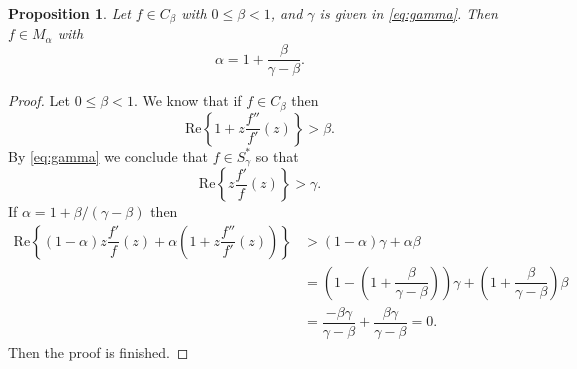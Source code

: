 \documentclass[10pt,a4paper]{amsart}
\newtheorem{prop}{Proposition}
\begin{document}
\begin{prop}\label{prop_alpha}
Let \( f\in C_\beta \) with \(0 \leq \beta <1 \), and  \( \gamma \) is given in \eqref{eq:gamma}. Then \( f\in M_\alpha \) with
\[\alpha=1+\dfrac{\beta}{\gamma-\beta}.\]
\end{prop}

\begin{proof}
    Let \(0\leq \beta <1 \). We know that if \( f\in C_\beta\) then
    \[\text{Re}\left\{1+z\dfrac{f''}{f'}(z)\right\}>\beta.\]
    By \eqref{eq:gamma} we conclude that \( f\in S^*_\gamma \) so that
    \[\text{Re}\left\{z\dfrac{f'}{f}(z)\right\}>\gamma. \]
    If \( \alpha=1+\beta/(\gamma-\beta) \) then
    \begin{align*}
      \text{Re}\left\{(1-\alpha)z\dfrac{f'}{f}(z)+\alpha\left(1+z\dfrac{f''}{f'}(z)\right)\right\}& > (1-\alpha)\gamma+\alpha\beta\\
      & =\left(1-\left(1+\dfrac{\beta}{\gamma-\beta}\right)\right)\gamma+\left(1+\dfrac{\beta}{\gamma-\beta}\right)\beta\\
      & = \dfrac{-\beta\gamma}{\gamma-\beta}+\dfrac{\beta\gamma}{\gamma-\beta}=0.
    \end{align*}
Then the proof is finished.
\end{proof}
\end{document}
